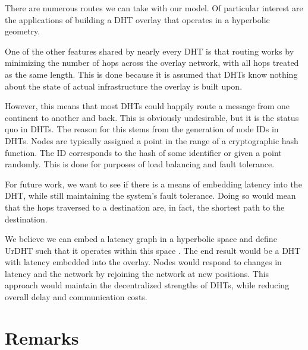 
There are numerous routes we can take with our model.
Of particular interest are the applications of building a DHT overlay that operates in a hyperbolic geometry.

One of the other features shared by nearly every DHT is that routing works by minimizing the number of hops across the overlay network, with all hops treated as the same length.
This is done because it is assumed that DHTs know nothing about the state of actual infrastructure the overlay is built upon.

However, this means that most DHTs could happily route a message from one continent to another and back.
This is obviously undesirable, but it is the status quo in DHTs.
The reason for this stems from the generation of node IDs in DHTs. 
Nodes are typically assigned a point in the range of a cryptographic hash function. 
The ID corresponds to the hash of some identifier or given a point randomly.
This is done for purposes of load balancing and fault tolerance.

For future work, we want to see if there is a means of embedding latency into the DHT, while still maintaining the system's fault tolerance.
Doing so would mean that the hops traversed to a destination are, in fact, the shortest path to the destination.

We believe we can embed a latency graph in a hyperbolic space and define UrDHT such that it operates within this space \cite{kleinberg2007geographic} \cite{cvetkovski2009hyperbolic}.
The end result would be a DHT with latency embedded into the overlay.
Nodes would respond to changes in latency and the network by rejoining the network at new positions.
This approach would maintain the decentralized strengths of DHTs, while reducing overall delay and communication costs.


\section{Remarks}